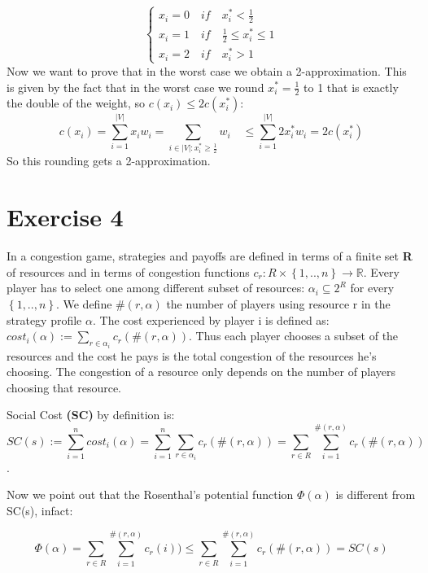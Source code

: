 \documentclass[11pt]{article}
\theoremstyle{definition}
\begin{document}
\begin{equation}
    \begin{cases}
      x_{i}=0\quad if\quad x_{i}^* < \frac{1}{2}\\
      x_{i}=1\quad if\quad \frac{1}{2} \leq x_{i}^* \leq 1\\
      x_{i}=2\quad if\quad x_{i}^* > 1
    \end{cases}
\end{equation}
Now we want to prove that in the worst case we obtain a 2-approximation. This is given by the fact that in the worst case we round $x_{i}^*=\frac{1}{2}$ to 1 that is exactly the double of the weight, so $c(x_{i}) \leq 2c(x_{i}^*)$:
\begin{equation}
c(x_{i}) = \sum_{i=1}^{|V|}x_{i}w_{i} = \sum_{i \in |V|:x_{i}^* \ge \frac{1}{2} } w_{i}\quad \leq \sum_{i=1}^{|V|}2x_{i}^* w_{i} = 2c(x_{i}^*)
\end{equation}
So this rounding gets a 2-approximation.


\newpage
\section{Exercise 4}
In a congestion game, strategies and payoffs are defined in terms of a finite set \textbf{R} of resources and in terms of congestion functions $c_{r}: R \times \left \{ 1,..,n \right \} \rightarrow \mathbb{R}$. Every player has to select one among different subset of resources: $ \alpha_{i} \subseteq 2^R$ for every $\left \{ 1,..,n \right \}$. 	We define $\#(r,\alpha)$ the number of players using resource r in the strategy profile $\alpha $.
The cost experienced by player i is defined as: $cost_{i}(\alpha) := \sum_{r \in \alpha_{i}}{ c_{r} (\#(r,\alpha))}$.
Thus each player chooses a subset of the resources and the cost he pays is the total congestion of the resources he's choosing. The congestion of a resource only depends on the number of players choosing that resource.

Social Cost \textbf{(SC)} by definition is: \begin{equation} SC(s) := \sum_{i=1}^{n} { cost_{i} (\alpha)} = \sum_{i=1}^{n} \sum_{r \in \alpha_{i}}{ c_{r} (\#(r,\alpha))} =  \sum_{r \in R} \sum_{i=1}^{\#(r,\alpha)}{ c_{r} (\#(r,\alpha))}  \end{equation}.

Now we point out that the Rosenthal’s potential function $\Phi(\alpha)$ is different from SC(s), infact:

\begin{equation}\Phi (\alpha) = \sum_{r \in R} \sum_{i=1}^{\#(r,\alpha)}{ c_{r} (i))} \le  \sum_{r \in R} \sum_{i=1}^{\#(r,\alpha)}{ c_{r} (\#(r,\alpha))}= SC(s) \end{equation}
\end{document}
